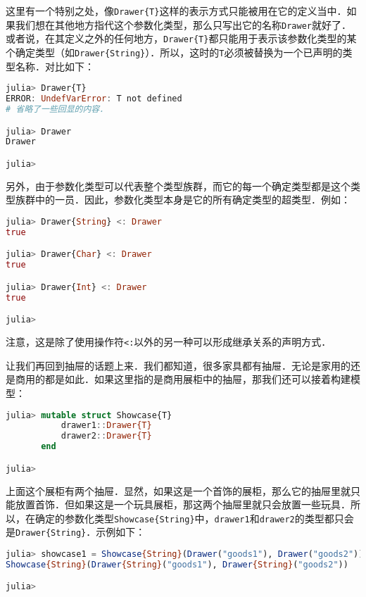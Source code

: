 这里有一个特别之处，像\verb|Drawer{T}|这样的表示方式只能被用在它的定义当中．如果我们想在其他地方指代这个参数化类型，那么只写出它的名称\verb|Drawer|就好了．或者说，在其定义之外的任何地方，\verb|Drawer{T}|都只能用于表示该参数化类型的某个确定类型（如\verb|Drawer{String}|）．所以，这时的\verb|T|必须被替换为一个已声明的类型名称．对比如下：

\begin{lstlisting}[language=julia]
julia> Drawer{T} 
ERROR: UndefVarError: T not defined
# 省略了一些回显的内容．

julia> Drawer
Drawer

julia> 
\end{lstlisting}

另外，由于参数化类型可以代表整个类型族群，而它的每一个确定类型都是这个类型族群中的一员．因此，参数化类型本身是它的所有确定类型的超类型．例如：

\begin{lstlisting}[language=julia]
julia> Drawer{String} <: Drawer
true

julia> Drawer{Char} <: Drawer
true

julia> Drawer{Int} <: Drawer
true

julia> 
\end{lstlisting}

注意，这是除了使用操作符\verb|<:|以外的另一种可以形成继承关系的声明方式．

让我们再回到抽屉的话题上来．我们都知道，很多家具都有抽屉．无论是家用的还是商用的都是如此．如果这里指的是商用展柜中的抽屉，那我们还可以接着构建模型：

\begin{lstlisting}[language=julia]
julia> mutable struct Showcase{T}
           drawer1::Drawer{T}
           drawer2::Drawer{T}
       end

julia> 
\end{lstlisting}

上面这个展柜有两个抽屉．显然，如果这是一个首饰的展柜，那么它的抽屉里就只能放置首饰．但如果这是一个玩具展柜，那这两个抽屉里就只会放置一些玩具．所以，在确定的参数化类型\verb|Showcase{String}|中，\verb|drawer1|和\verb|drawer2|的类型都只会是\verb|Drawer{String}|．示例如下：

\begin{lstlisting}[language=julia]
julia> showcase1 = Showcase{String}(Drawer("goods1"), Drawer("goods2"))
Showcase{String}(Drawer{String}("goods1"), Drawer{String}("goods2"))

julia> 
\end{lstlisting}

